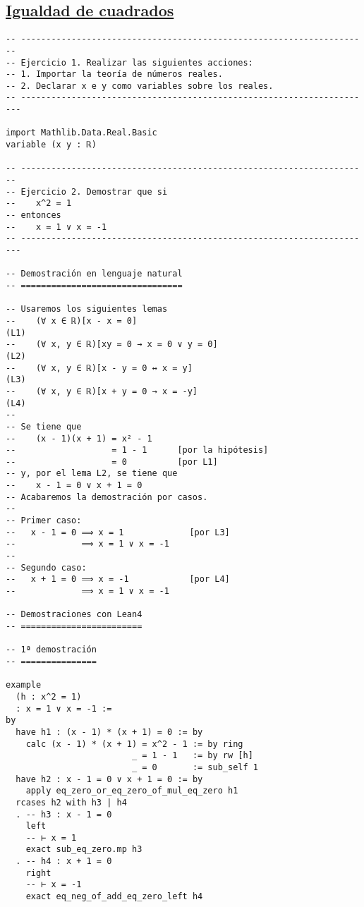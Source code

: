 \subsection{\href{./src/Logica/Igualdad\_de\_cuadrados.lean}{Igualdad de cuadrados}}
\label{sec:org89d85cc}
\begin{verbatim}
-- ---------------------------------------------------------------------
-- Ejercicio 1. Realizar las siguientes acciones:
-- 1. Importar la teoría de números reales.
-- 2. Declarar x e y como variables sobre los reales.
-- ----------------------------------------------------------------------

import Mathlib.Data.Real.Basic
variable (x y : ℝ)

-- ---------------------------------------------------------------------
-- Ejercicio 2. Demostrar que si
--    x^2 = 1
-- entonces
--    x = 1 ∨ x = -1
-- ----------------------------------------------------------------------

-- Demostración en lenguaje natural
-- ================================

-- Usaremos los siguientes lemas
--    (∀ x ∈ ℝ)[x - x = 0]                                           (L1)
--    (∀ x, y ∈ ℝ)[xy = 0 → x = 0 ∨ y = 0]                           (L2)
--    (∀ x, y ∈ ℝ)[x - y = 0 ↔ x = y]                                (L3)
--    (∀ x, y ∈ ℝ)[x + y = 0 → x = -y]                               (L4)
--
-- Se tiene que
--    (x - 1)(x + 1) = x² - 1
--                   = 1 - 1      [por la hipótesis]
--                   = 0          [por L1]
-- y, por el lema L2, se tiene que
--    x - 1 = 0 ∨ x + 1 = 0
-- Acabaremos la demostración por casos.
--
-- Primer caso:
--   x - 1 = 0 ⟹ x = 1             [por L3]
--             ⟹ x = 1 ∨ x = -1
--
-- Segundo caso:
--   x + 1 = 0 ⟹ x = -1            [por L4]
--             ⟹ x = 1 ∨ x = -1

-- Demostraciones con Lean4
-- ========================

-- 1ª demostración
-- ===============

example
  (h : x^2 = 1)
  : x = 1 ∨ x = -1 :=
by
  have h1 : (x - 1) * (x + 1) = 0 := by
    calc (x - 1) * (x + 1) = x^2 - 1 := by ring
                         _ = 1 - 1   := by rw [h]
                         _ = 0       := sub_self 1
  have h2 : x - 1 = 0 ∨ x + 1 = 0 := by
    apply eq_zero_or_eq_zero_of_mul_eq_zero h1
  rcases h2 with h3 | h4
  . -- h3 : x - 1 = 0
    left
    -- ⊢ x = 1
    exact sub_eq_zero.mp h3
  . -- h4 : x + 1 = 0
    right
    -- ⊢ x = -1
    exact eq_neg_of_add_eq_zero_left h4


\end{verbatim}
